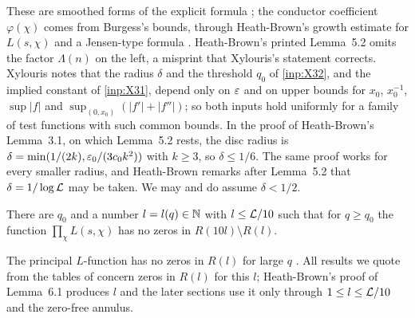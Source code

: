 These are smoothed forms of the explicit formula
\cite{Weil1952formules,Davenport2000multiplicative,MontgomeryVaughan2007multiplicative,IwaniecKowalski2004analytic};
the conductor coefficient $\varphi(\chi)$ comes from Burgess's bounds, through Heath-Brown's
growth estimate for $L(s,\chi)$ and a Jensen-type formula \cite[\S\S2--3]{HeathBrown1992zero}. Heath-Brown's printed Lemma~5.2 omits the factor $\Lambda(n)$ on
the left, a misprint that Xylouris's statement corrects. Xylouris notes \cite[p.~36]{Xylouris2011nullstellen}
that the radius $\delta$ and the threshold $q_0$ of \cref{inp:X32}, and the implied constant of
\cref{inp:X31}, depend only on $\varepsilon$ and on upper bounds for $x_0$, $x_0^{-1}$, $\sup|f|$ and
$\sup_{(0,x_0)}(|f'|+|f''|)$; so both inputs hold uniformly for a family of test functions with
such common bounds. In the proof of Heath-Brown's Lemma~3.1, on which Lemma~5.2
rests, the disc radius is $\delta=\min(1/(2k),\varepsilon_0/(3c_0k^2))$ with $k\ge3$, so $\delta\le1/6$.
The same proof works for every smaller radius, and Heath-Brown remarks after Lemma~5.2 that
$\delta=1/\log\mathcal{L}$ may be taken. We may and do assume $\delta<1/2$.

\begin{inp}\label{inp:rectangle}
There are $q_0$ and a number $l=l(q)\in\mathbb{N}$ with $l\le\mathcal{L}/10$ such that for $q\ge q_0$ the function
$\prod_{\chi}L(s,\chi)$ has no zeros in $R(10l)\setminus R(l)$.
\end{inp}

The principal $L$-function has no zeros in $R(l)$ for large $q$ \cite[p.~21]{Xylouris2011nullstellen}.
All results we quote from the tables of \cite{HeathBrown1992zero,Xylouris2011nullstellen} concern zeros in
$R(l)$ for this $l$; Heath-Brown's proof of Lemma~6.1 produces $l$ and the later sections use it
only through $1\le l\le\mathcal{L}/10$ and the zero-free annulus.

